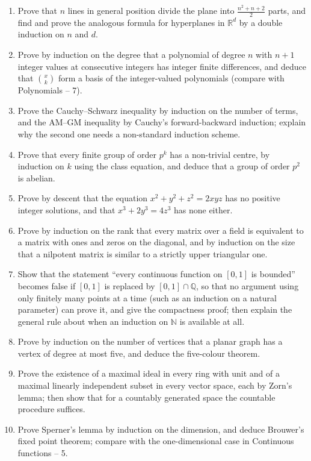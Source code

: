 \documentclass[11pt,a4paper]{article}
\begin{document}
\begin{enumerate}[itemsep=0.4em,topsep=7.4pt]
\item Prove that $n$ lines in general position divide the plane into $\frac{n^2+n+2}{2}$ parts,
and find and prove the analogous formula for hyperplanes in $\mathbb R^d$ by a double induction on
$n$ and $d$.

\item Prove by induction on the degree that a polynomial of degree $n$ with $n+1$ integer values
at consecutive integers has integer finite differences, and deduce that $\binom xk$ form a basis
of the integer-valued polynomials (compare with Polynomials -- 7).

\item Prove the Cauchy--Schwarz inequality by induction on the number of terms, and the AM--GM
inequality by Cauchy's forward-backward induction; explain why the second one needs a
non-standard induction scheme.

\item Prove that every finite group of order $p^k$ has a non-trivial centre, by induction on $k$
using the class equation, and deduce that a group of order $p^2$ is abelian.

\item Prove by descent that the equation $x^2+y^2+z^2=2xyz$ has no positive integer solutions, and
that $x^3+2y^3=4z^3$ has none either.

\item Prove by induction on the rank that every matrix over a field is equivalent to a matrix with
ones and zeros on the diagonal, and by induction on the size that a nilpotent matrix is similar
to a strictly upper triangular one.

\item Show that the statement ``every continuous function on $[0,1]$ is bounded'' becomes false
if $[0,1]$ is replaced by $[0,1]\cap\mathbb Q$, so that no argument using only finitely many
points at a time (such as an induction on a natural parameter) can prove it, and give the
compactness proof; then explain the general rule about when an induction on $\mathbb N$ is
available at all.

\item Prove by induction on the number of vertices that a planar graph has a vertex of degree at
most five, and deduce the five-colour theorem.

\item Prove the existence of a maximal ideal in every ring with unit and of a maximal linearly
independent subset in every vector space, each by Zorn's lemma; then show that for a countably
generated space the countable procedure suffices.

\item Prove Sperner's lemma by induction on the dimension, and deduce Brouwer's fixed point
theorem; compare with the one-dimensional case in Continuous functions -- 5.
\end{enumerate}
\end{document}
